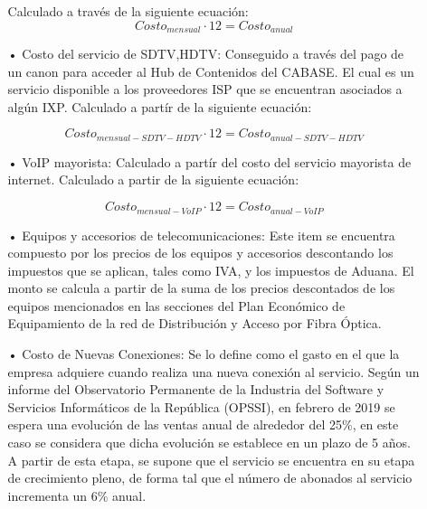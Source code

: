 \begin{enumerate}
\begin{enumerate}
Calculado a través de la siguiente ecuación:
\begin{equation}
Costo_{mensual}\cdot 12 = Costo_{anual}
\end{equation}

\item[•]Costo del servicio de SDTV,HDTV: Conseguido a través del pago de un canon para acceder al Hub de Contenidos del CABASE.
El cual es un servicio disponible a los proveedores ISP que se encuentran asociados a algún IXP.
Calculado a partír de la siguiente ecuación:

\begin{equation}
Costo_{mensual-SDTV-HDTV}\cdot 12 = Costo_{anual-SDTV-HDTV}
\end{equation}

\item[•]VoIP mayorista: Calculado a partír del costo del servicio mayorista de internet.
Calculado a partir de la siguiente ecuación:

\begin{equation}
Costo_{mensual-VoIP}\cdot 12 = Costo_{anual-VoIP}
\end{equation}

\item[•]Equipos y accesorios de telecomunicaciones: Este item se encuentra compuesto por los precios de los equipos y accesorios 
descontando los impuestos que se aplican, tales como IVA, y los impuestos de Aduana. El monto se calcula a partir de la suma
de los precios descontados de los equipos mencionados en las secciones del Plan Económico de Equipamiento de la red de Distribución
y Acceso por Fibra Óptica.

\item[•]Costo de Nuevas Conexiones: Se lo define como el gasto en el que la empresa adquiere cuando realiza una nueva conexión al servicio.
Según un informe del Observatorio Permanente de la Industria del Software y Servicios Informáticos de la República
(OPSSI), en febrero de 2019 se espera una evolución de las ventas anual de alrededor del 25\%, 
en este caso se considera que dicha evolución se establece en un plazo de 5 años.
A partir de esta etapa, se supone que el servicio se encuentra en su etapa de crecimiento pleno, de forma tal que el número de
abonados al servicio incrementa un 6\% anual.


\end{enumerate}
\end{enumerate}
